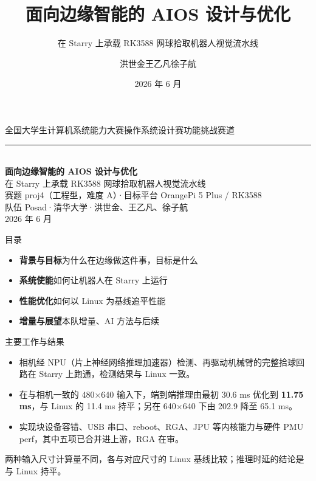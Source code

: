 \documentclass[aspectratio=169,fontset=mac]{ctexbeamer}
\title{面向边缘智能的 AIOS 设计与优化}
\subtitle{在 Starry 上承载 RK3588 网球拾取机器人视觉流水线}
\author{洪世金\quad 王乙凡\quad 徐子航}
\institute{队伍 Posad\quad 清华大学}
\date{2026 年 6 月}
\newcommand{\keyline}[1]{\par\vskip3pt\noindent\colorbox{tintbox}{\parbox{0.91\textwidth}{\color{ink}#1}}\par}
\begin{document}
%
\begin{frame}[plain]
\vfill
\begin{center}
{\sffamily\color{ink!75}\small 全国大学生计算机系统能力大赛\quad 操作系统设计赛\quad 功能挑战赛道}\\[10pt]
{\color{rulecol}\rule{0.86\textwidth}{1pt}}\\[16pt]
{\sffamily\bfseries\color{ink}\fontsize{24}{30}\selectfont 面向边缘智能的 AIOS 设计与优化}\\[10pt]
{\color{textcol}\large 在 Starry 上承载 RK3588 网球拾取机器人视觉流水线}\\[20pt]
{\color{ink!85}赛题 proj4（工程型，难度 A）\quad·\quad 目标平台 OrangePi 5 Plus / RK3588}\\[8pt]
{\color{ink!85}队伍 Posad\quad·\quad 清华大学\quad·\quad 洪世金、王乙凡、徐子航}\\[8pt]
{\color{ink!70}\small 2026 年 6 月}
\end{center}
\vfill
\end{frame}

%
\begin{frame}{目录}
\vskip4pt
\begin{itemize}
\item \textbf{背景与目标}\quad 为什么在边缘做这件事，目标是什么
\item \textbf{系统使能}\quad 如何让机器人在 Starry 上运行
\item \textbf{性能优化}\quad 如何以 Linux 为基线追平性能
\item \textbf{增量与展望}\quad 本队增量、AI 方法与后续
\end{itemize}
\end{frame}

%
\begin{frame}{主要工作与结果}
\begin{itemize}
\item 相机经 NPU（片上神经网络推理加速器）检测、再驱动机械臂的完整拾球回路在 Starry 上跑通，检测结果与 Linux 一致。
\item 在与相机一致的 480×640 输入下，端到端推理由最初 30.6 ms 优化到 \textbf{11.75 ms}，与 Linux 的 11.4 ms 持平；另在 640×640 下由 202.9 降至 65.1 ms。
\item 实现块设备容错、USB 串口、reboot、RGA、JPU 等内核能力与硬件 PMU perf，其中五项已合并进上游，RGA 在审。
\end{itemize}
\keyline{两种输入尺寸计算量不同，各与对应尺寸的 Linux 基线比较；推理时延的结论是与 Linux 持平。}
\end{frame}
\end{document}
